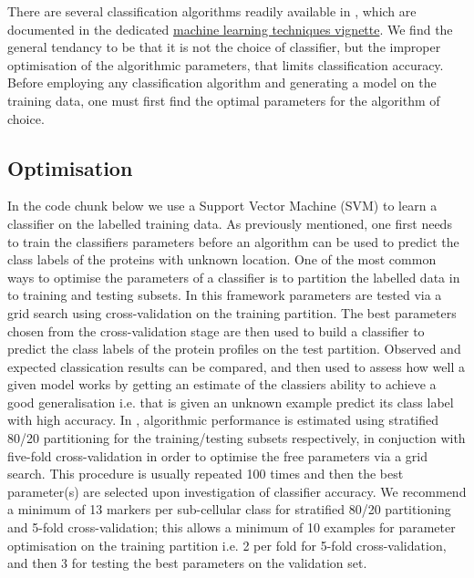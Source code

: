 There are several classification algorithms readily available in
, which are documented in the dedicated
\href{http://bioconductor.org/packages/release/bioc/vignettes/pRoloc/inst/doc/pRoloc-ml.pdf}{
  machine learning techniques vignette}.  We find the general tendancy
to be that it is not the choice of classifier, but the improper
optimisation of the algorithmic parameters, that limits classification
accuracy. Before employing any classification algorithm and generating
a model on the training data, one must first find the optimal
parameters for the algorithm of choice.

\subsection*{Optimisation}

In the code chunk below we use a Support Vector Machine (SVM) to learn
a classifier on the labelled training data. As previously mentioned,
one first needs to train the classifiers parameters before an
algorithm can be used to predict the class labels of the proteins with
unknown location. One of the most common ways to optimise the
parameters of a classifier is to partition the labelled data in to
training and testing subsets. In this framework parameters are tested
via a grid search using cross-validation on the training
partition. The best parameters chosen from the cross-validation stage
are then used to build a classifier to predict the class labels of the
protein profiles on the test partition. Observed and expected
classication results can be compared, and then used to assess how well
a given model works by getting an estimate of the classiers ability to
achieve a good generalisation i.e. that is given an unknown example
predict its class label with high accuracy. In ,
algorithmic performance is estimated using stratified 80/20
partitioning for the training/testing subsets respectively, in
conjuction with five-fold cross-validation in order to optimise the
free parameters via a grid search. This procedure is usually repeated
100 times and then the best parameter(s) are selected upon
investigation of classifier accuracy. We recommend a minimum of 13
markers per sub-cellular class for stratified 80/20 partitioning and
5-fold cross-validation; this allows a minimum of 10 examples for
parameter optimisation on the training partition i.e. 2 per fold for
5-fold cross-validation, and then 3 for testing the best parameters on
the validation set.

